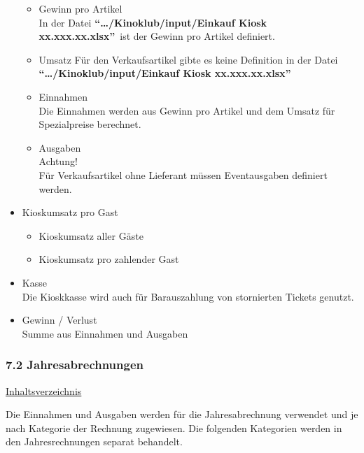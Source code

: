 \documentclass[
]{article}
\providecommand{\tightlist}{%
  \setlength{\itemsep}{0pt}\setlength{\parskip}{0pt}}
\begin{document}
\begin{itemize}
  \begin{itemize}
  \tightlist
  \item
    Gewinn pro Artikel\\
    In der Datei \textbf{``\ldots/Kinoklub/input/Einkauf Kiosk
    xx.xxx.xx.xlsx''}~ist der Gewinn pro Artikel definiert.
  \item
    Umsatz Für den Verkaufsartikel gibte es keine Definition in der
    Datei \textbf{``\ldots/Kinoklub/input/Einkauf Kiosk
    xx.xxx.xx.xlsx''}\\
  \item
    Einnahmen\\
    Die Einnahmen werden aus Gewinn pro Artikel und dem Umsatz für
    Spezialpreise berechnet.
  \item
    Ausgaben\\
    Achtung!\\
    Für Verkaufsartikel ohne Lieferant müssen Eventausgaben definiert
    werden.
  \end{itemize}
\item
  Kioskumsatz pro Gast

  \begin{itemize}
  \tightlist
  \item
    Kioskumsatz aller Gäste
  \item
    Kioskumsatz pro zahlender Gast
  \end{itemize}
\item
  Kasse\\
  Die Kioskkasse wird auch für Barauszahlung von stornierten Tickets
  genutzt.
\item
  Gewinn / Verlust\\
  Summe aus Einnahmen und Ausgaben
\end{itemize}

\subsubsection{7.2 Jahresabrechnungen}\label{jahresabrechnungen}

\hyperref[Inhaltsverzeichnis]{Inhaltsverzeichnis}

Die Einnahmen und Ausgaben werden für die Jahresabrechnung verwendet und
je nach Kategorie der Rechnung zugewiesen. Die folgenden Kategorien
werden in den Jahresrechnungen separat behandelt.
\end{document}
